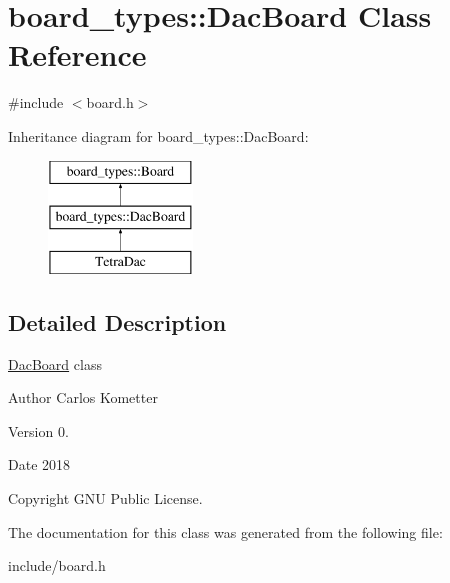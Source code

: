\hypertarget{classboard__types_1_1DacBoard}{}\section{board\+\_\+types\+:\+:Dac\+Board Class Reference}
\label{classboard__types_1_1DacBoard}


{\ttfamily \#include $<$board.\+h$>$}

Inheritance diagram for board\+\_\+types\+:\+:Dac\+Board\+:\begin{figure}[H]
\begin{center}
\leavevmode
\includegraphics[height=3.000000cm]{classboard__types_1_1DacBoard}
\end{center}
\end{figure}


\subsection{Detailed Description}
\mbox{\hyperlink{classboard__types_1_1DacBoard}{Dac\+Board}} class \begin{DoxyAuthor}{Author}
Carlos Kometter 
\end{DoxyAuthor}
\begin{DoxyVersion}{Version}
0. 
\end{DoxyVersion}
\begin{DoxyDate}{Date}
2018 
\end{DoxyDate}
\begin{DoxyCopyright}{Copyright}
G\+NU Public License. 
\end{DoxyCopyright}


The documentation for this class was generated from the following file\+:\begin{DoxyCompactItemize}
\item 
include/board.\+h\end{DoxyCompactItemize}
